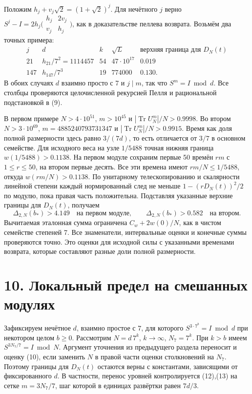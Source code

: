 \documentclass[11pt,a4paper]{article}
\newcommand{\Tr}{\operatorname{Tr}}
\newcommand{\sect}[1]{\section*{\sffamily\color{ink}#1}}
\begin{document}
Положим $h_j+v_j\sqrt2=(1+\sqrt2)^j$. Для нечётного $j$ верно $S^j-I=2h_j\bigl(\begin{smallmatrix}h_j&2v_j\\ v_j&h_j\end{smallmatrix}\bigr)$, как в доказательстве пеллева возврата. Возьмём два точных примера:
\[
\begin{array}{c|c|c|c|c}
j&d&k&\sqrt L&\text{верхняя граница для }D_N(t)\\\hline
21&h_{21}/7^2=1114457&54&47\cdot10^{17}&0.019\\
147&h_{147}/7^3&19&774000&0.130 .
\end{array}
\]
В обоих случаях $d$ взаимно просто с 7 и $j\mid m$, так что $S^m=I\bmod d$. Все столбцы проверяются целочисленной рекурсией Пелля и рациональной подстановкой в (9).

В первом примере $N>4\cdot10^{51}$, $m>10^{45}$ и $|\Tr U_N^m|/N>0.9998$. Во втором $N>3\cdot10^{69}$, $m=4885240793731347$ и $|\Tr U_N^m|/N>0.9915$. Время как доля полной размерности здесь равно $3/(7d)$, то есть отличается от $3/7$ в основном семействе. Для исходного веса на узле $1/5488$ точная нижняя граница $w(1/5488)>0.1138$. На первом модуле сохраним первые 50 времён $rm$ с $1\le r\le50$, на втором первые десять. Все эти времена имеют $rm/N\le1/5488$, откуда $w(rm/N)>0.1138$. По унитарному телескопированию и скалярности линейной степени каждый нормированный след не меньше $1-(rD_N(t))^2/2$ по модулю, пока правая часть положительна. Подставляя указанные верхние границы для $D_N(t)$, получаем
\[
     \Delta_{2,N}(b_*)>4.149\quad\text{на первом модуле},\qquad
     \Delta_{2,N}(b_*)>0.582\quad\text{на втором}.
\]
Вычитаемая эталонная сумма ограничена $C_w+2w(0)/N$, как в чистом семействе степеней 7. Все знаменатели, интервальные оценки и конечные суммы проверяются точно. Это оценки для исходной силы с указанными временами возврата, которые составляют разные доли полной размерности.

\newpage
\sect{10. Локальный предел на смешанных модулях}
Зафиксируем нечётное $d$, взаимно простое с 7, для которого $S^{3\cdot 7^b}=I\bmod d$ при некотором целом $b\ge0$. Рассмотрим $N=d\,7^k$, $k\to\infty$, $N_7=7^k$. При $k>b$ имеем $S^{3N_7/7}=I\bmod N$. Аргумент уточнения из предыдущего раздела переносит и оценку (10), если заменить $N$ в правой части оценки столкновений на $N_7$. Поэтому границы для $D_N(t)$ остаются верны с константами, зависящими от фиксированного $d$. В частности, перенос уровней контролируется (12),(13) на сетке $m=3N_7/7$, шаг которой в единицах развёртки равен $7d/3$.
\end{document}
